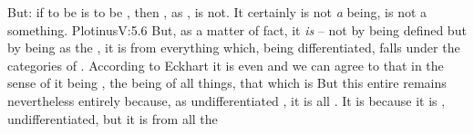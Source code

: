 \pa\label{Oneis} But: if to be is to be , then , as
, is not.  It certainly is not {\em a} being, is not a something.
\citet{Being must have some definition and therefore be limited; but the First
  cannot be thought of as having definition and limit, for thus it would not be
  the Source but the particular item indicated by the
  definition.}{Plotinus}{V:5.6} But, as a matter of fact, it {\em is} -- not by
being defined but by being  as the , it is
 from everything which, being differentiated, falls under the
categories of .  According to Eckhart it is even
 and we can agree to that in the sense of it
being , the being of all things, that which is 
 But this entire  remains nevertheless
entirely  because, as undifferentiated , it is
 all .  It is  because it is
, undifferentiated, but it is  from all the
